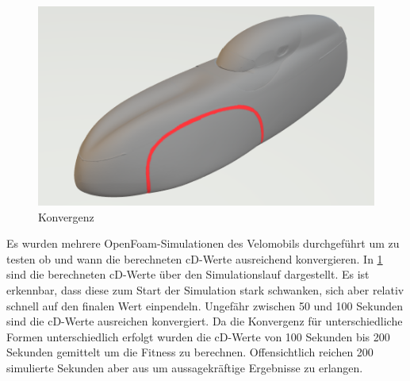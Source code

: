 \begin{figure}[h]
	\centering
	\includegraphics[width=.8\linewidth]{bilder/velo_wheelcase}
	\caption{Konvergenz}
	\label{fig:wheelcase_convergence}
\end{figure}
Es wurden mehrere OpenFoam-Simulationen des Velomobils durchgeführt um zu testen ob und wann die berechneten cD-Werte ausreichend konvergieren.
In \cref{fig:wheelcase_convergence} sind die berechneten cD-Werte über den Simulationslauf dargestellt. 
Es ist erkennbar, dass diese zum Start der Simulation stark schwanken, sich aber relativ schnell auf den finalen Wert einpendeln.
Ungefähr zwischen 50 und 100 Sekunden sind die cD-Werte ausreichen konvergiert.
Da die Konvergenz für unterschiedliche Formen unterschiedlich erfolgt wurden die cD-Werte von 100 Sekunden bis 200 Sekunden gemittelt um die Fitness zu berechnen.
Offensichtlich reichen 200 simulierte Sekunden aber aus um aussagekräftige Ergebnisse zu erlangen.



